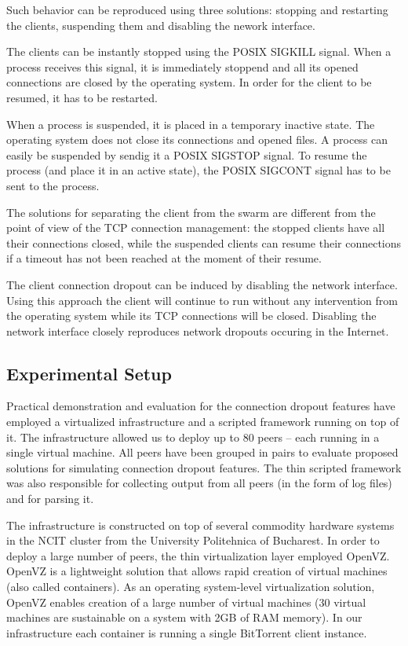 Such behavior can be reproduced using three solutions: stopping and restarting
the clients, suspending them and disabling the nework interface.

The clients can be instantly stopped using the POSIX SIGKILL signal. When a
process receives this signal, it is immediately stoppend and all its opened
connections are closed by the operating system. In order for the client to be
resumed, it has to be restarted.

When a process is suspended, it is placed in a temporary inactive state. The
operating system does not close its connections and opened files. A process
can easily be suspended by sendig it a POSIX SIGSTOP signal. To resume the
process (and place it in an active state), the POSIX SIGCONT signal has to be
sent to the process.

The solutions for separating the client from the swarm are different from the
point of view of the TCP connection management: the stopped clients have all
their connections closed, while the suspended clients can resume their
connections if a timeout has not been reached at the moment of their resume.

The client connection dropout can be induced by disabling the network
interface. Using this approach the client will continue to run without any
intervention from the operating system while its TCP connections will be
closed. Disabling the network interface closely reproduces network dropouts
occuring in the Internet.

\subsection{Experimental Setup}
\label{subsec:virt-infra:dropouts-setup}

Practical demonstration and evaluation for the connection dropout features
have employed a virtualized infrastructure and a scripted framework running on
top of it. The infrastructure allowed us to deploy up to 80 peers -- each
running in a single virtual machine. All peers have been grouped in pairs to
evaluate proposed solutions for simulating connection dropout features. The
thin scripted framework was also responsible for collecting output from all
peers (in the form of log files) and for parsing it.

The infrastructure is constructed on top of several commodity hardware systems
in the NCIT cluster from the University Politehnica of Bucharest. In order to
deploy a large number of peers, the thin virtualization layer employed OpenVZ.
OpenVZ is a lightweight solution that allows rapid creation of
virtual machines (also called containers). As an operating system-level
virtualization solution, OpenVZ enables creation of a large number of virtual
machines (30 virtual machines are sustainable on a system with 2GB of RAM
memory). In our infrastructure each container is running a single BitTorrent
client instance.

